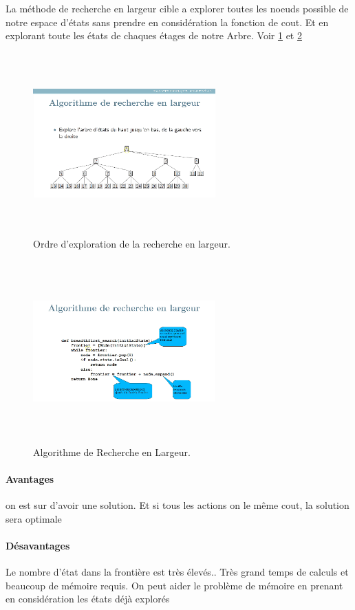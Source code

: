 \documentclass[oneside]{book}
\begin{document}
La méthode de recherche en largeur cible a explorer toutes les noeuds possible de notre espace d'états sans prendre en considération la fonction de cout. Et en explorant toute les états de chaques étages de notre Arbre. Voir \ref{fig:Recherche_en_largeur} et \ref{fig:Algo_Recherche_en_largeur}

\begin{figure}[!ht]
\centering
\includegraphics[width = 7cm, height = 7cm, keepaspectratio]{Recherche_Largeur.png}
\caption{Ordre d'exploration de la recherche en largeur.}
\label{fig:Recherche_en_largeur}
\end{figure}

\begin{figure}[!ht]
\centering
\includegraphics[width = 7cm, height = 7cm, keepaspectratio]{algo_largeur.png}
\caption{Algorithme de Recherche en Largeur.}
\label{fig:Algo_Recherche_en_largeur}
\end{figure}
\paragraph{Avantages}
on est sur d'avoir une solution. Et si tous les actions on le même cout, la solution sera optimale
\paragraph{Désavantages}
Le nombre d'état dans la frontière est très élevés.. Très grand temps de calculs et beaucoup de mémoire requis. On peut aider le problème de mémoire en prenant en considération les états déjà explorés
\end{document}
